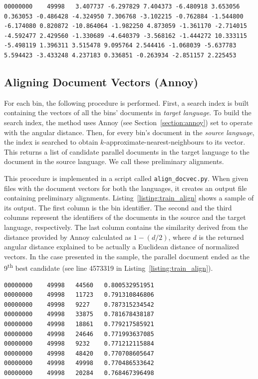 \begin{lstlisting}[float=!htb,caption={Sample from a file With English document vectors (training)},label={listing:train_docvec_en},firstnumber=49999]
00000000	49998	3.407737 -6.297829 7.404373 -6.480918 3.653056 0.363053 -0.486428 -4.324950 7.306768 -3.102215 -0.762884 -1.544800 -6.174080 0.820872 -10.864064 -1.982250 4.873059 -1.361170 -2.714015 -4.592477 2.429560 -1.330689 -4.640379 -3.568162 -1.444272 10.333115 -5.498119 1.396311 3.515478 9.095764 2.544416 -1.068039 -5.637783 5.594423 -3.433248 4.237183 0.336851 -0.263934 -2.851157 2.225453
\end{lstlisting}

\subsection{Aligning Document Vectors (Annoy)}
\label{subsection:aligning_document_vectors}

For each bin, the following procedure is performed. First, a search index is built containing the vectors of all the bins' documents in \textit{target language}. To build the search index, the method uses Annoy (see Section~\ref{section:annoy}) set to operate with the angular distance. Then, for every bin's document in the \textit{source language}, the index is searched to obtain $k$-approximate-nearest-neighbours to its vector. This returns a list of candidate parallel documents in the target language to the document in the source language. We call these preliminary alignments.

This procedure is implemented in a script called \texttt{align\_docvec.py}. When given files with the document vectors for both the languages, it creates an output file containing preliminary alignments. Listing~\ref{listing:train_align} shows a sample of its output. The first column is the bin identifier. The second and the third columns represent the identifiers of the documents in the source and the target language, respectively. The last column contains the similarity derived from the distance provided by Annoy calculated as $1-(d/2)$, where $d$ is the returned angular distance explained to be actually a Euclidean distance of normalized vectors. In the case presented in the sample, the parallel document ended as the 9\textsuperscript{th} best candidate (see line 4573319 in Listing~\ref{listing:train_align}).

\begin{lstlisting}[float=!htb,caption={Sample from a file with preliminary alignments (training)},label={listing:train_align},firstnumber=457311]
00000000	49998	44560	0.800532951951
00000000	49998	11723	0.791310846806
00000000	49998	9227	0.787315234542
00000000	49998	33875	0.781678438187
00000000	49998	18861	0.779217585921
00000000	49998	24646	0.771993637085
00000000	49998	9232	0.771212115884
00000000	49998	48420	0.770708605647
00000000	49998	49998	0.770486533642
00000000	49998	20284	0.768467396498
\end{lstlisting}

